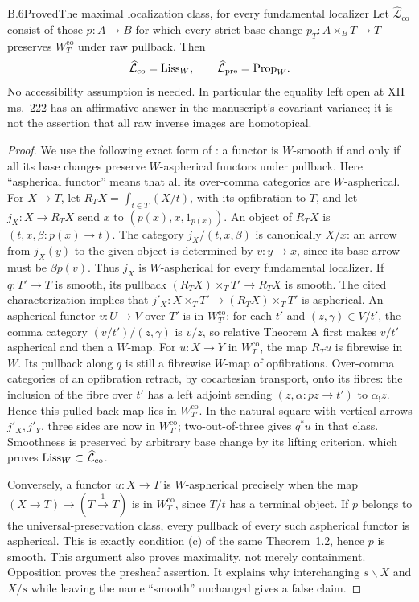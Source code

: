 \begin{claim}{B.6}{Proved}{The maximal localization class, for every fundamental localizer}
Let $\widehat{\mathcal L}_{\mathrm{co}}$ consist of those $p:A\to B$ for
which every strict base change $p_T:A\times_BT\to T$ preserves
$W^{\mathrm{co}}_T$ under raw pullback. Then
\[
 \widehat{\mathcal L}_{\mathrm{co}}=\mathrm{Liss}_W,
 \qquad \widehat{\mathcal L}_{\mathrm{pre}}=\mathrm{Prop}_W.
\]
No accessibility assumption is needed. In particular the equality left open
at XII ms.~222 has an affirmative answer in the manuscript's covariant
variance; it is not the assertion that all raw inverse images are homotopical.
\end{claim}
\begin{proof}
We use the following exact form of \citet[Theorem 1.2(c)]{BCMaltsiniotis2005}:
a functor is $W$-smooth if and only if all its base changes preserve
$W$-aspherical functors under pullback. Here ``aspherical functor'' means
that all its over-comma categories are $W$-aspherical.
For $X\to T$, let $R_TX=\int_{t\in T}(X/t)$, with its opfibration to $T$,
and let $j_X:X\to R_TX$ send $x$ to $(p(x),x,1_{p(x)})$.
An object of $R_TX$ is $(t,x,\beta:p(x)\to t)$. The category
$j_X/(t,x,\beta)$ is canonically $X/x$: an arrow from $j_X(y)$ to the
given object is determined by $v:y\to x$, since its base arrow must be
$\beta p(v)$. Thus $j_X$ is $W$-aspherical for every fundamental localizer.
If $q:T'\to T$ is smooth, its pullback
$(R_TX)\times_TT'\to R_TX$ is smooth. The cited characterization implies
that $j'_X:X\times_TT'\to(R_TX)\times_TT'$ is aspherical.
An aspherical functor $v:U\to V$ over $T'$ is in
$W^{\mathrm{co}}_{T'}$: for each $t'$ and $(z,\gamma)\in V/t'$, the
comma category $(v/t')/(z,\gamma)$ is $v/z$, so relative Theorem A first
makes $v/t'$ aspherical and then a $W$-map.
For $u:X\to Y$ in $W^{\mathrm{co}}_T$, the map $R_Tu$ is fibrewise in $W$.
Its pullback along $q$ is still a fibrewise $W$-map of opfibrations.
Over-comma categories of an opfibration retract, by cocartesian transport,
onto its fibres: the inclusion of the fibre over $t'$ has a left adjoint
sending $(z,\alpha:pz\to t')$ to $\alpha_!z$. Hence this pulled-back map
lies in $W^{\mathrm{co}}_{T'}$.
In the natural square with vertical arrows $j'_X,j'_Y$, three sides are now
in $W^{\mathrm{co}}_{T'}$; two-out-of-three gives $q^*u$ in that class.
Smoothness is preserved by arbitrary base change by its lifting criterion,
which proves $\mathrm{Liss}_W\subset\widehat{\mathcal L}_{\mathrm{co}}$.

Conversely, a functor $u:X\to T$ is $W$-aspherical precisely when the map
$(X\to T)\to(T\xrightarrow{1}T)$ is in $W^{\mathrm{co}}_T$, since
$T/t$ has a terminal object. If $p$ belongs to the universal-preservation
class, every pullback of every such aspherical functor is aspherical.
This is exactly condition (c) of the same Theorem~1.2, hence $p$ is smooth.
This argument also proves maximality, not merely containment. Opposition
proves the presheaf assertion. It explains why interchanging $s\backslash X$
and $X/s$ while leaving the name ``smooth'' unchanged gives a false claim.
\end{proof}

